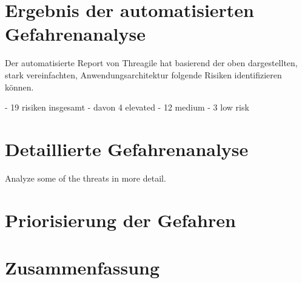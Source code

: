 \documentclass{article}
\begin{document}
\section{Ergebnis der automatisierten Gefahrenanalyse}

Der automatisierte Report von Threagile hat basierend der oben dargestellten, stark 
vereinfachten, Anwendungsarchitektur folgende Risiken identifizieren können.

- 19 risiken insgesamt
- davon 4 elevated
- 12 medium
- 3 low risk

\section{Detaillierte Gefahrenanalyse}

Analyze some of the threats in more detail.

\section{Priorisierung der Gefahren}

\section{Zusammenfassung}

\end{document}
